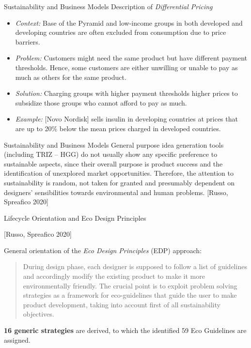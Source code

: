 \documentclass{beamer}
\begin{document}
\begin{frame}{Sustainability and Business Models}
Description of \emph{Differential Pricing}
\begin{itemize}
\item \emph{Context:} Base of the Pyramid and low-income groups in both
  developed and developing countries are often excluded from consumption due
  to price barriers.
\item \emph{Problem:} Customers might need the same product but have different
  payment thresholds. Hence, some customers are either unwilling or unable to
  pay as much as others for the same product.
\item \emph{Solution:} Charging groups with higher payment thresholds higher
  prices to subsidize those groups who cannot afford to pay as much.
\item \emph{Example:} [Novo Nordisk] sells insulin in developing countries at
  prices that are up to 20\% below the mean prices charged in developed
  countries.
\end{itemize}
\end{frame}

\begin{frame}{Sustainability and Business Models}
  General purpose idea generation tools (including TRIZ -- HGG) do not usually
  show any specific preference to sustainable aspects, since their overall
  purpose is product success and the identification of unexplored market
  opportunities.  Therefore, the attention to sustainability is random, not
  taken for granted and presumably dependent on designers’ sensibilities
  towards environmental and human problems. [Russo, Spreafico 2020]
\end{frame}

\begin{frame}{Lifecycle Orientation and Eco Design Principles}

  [Russo, Spreafico 2020]

General orientation of the \emph{Eco Design Principles} (EDP) approach:
\begin{quote}
  During design phase, each designer is supposed to follow a list of
  guidelines and accordingly modify the existing product to make it more
  environmentally friendly. The crucial point is to exploit problem solving
  strategies as a framework for eco-guidelines that guide the user to make
  product development, taking into account first of all sustainability
  objectives.
\end{quote}

\textbf{16 generic strategies} are derived, to which the identified 59 Eco
Guidelines are assigned.

\end{frame}
\end{document}
